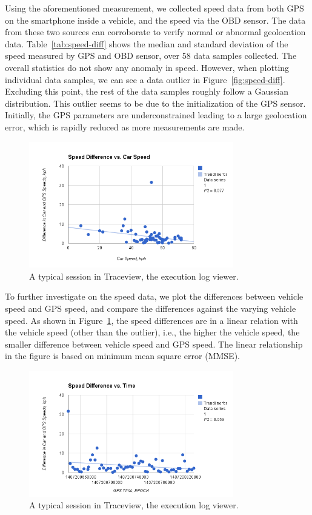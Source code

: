 Using the aforementioned measurement, we collected speed data from both GPS 
on the smartphone inside a vehicle, and the speed via the OBD sensor. 
The data from these two sources can corroborate to verify normal or abnormal 
geolocation data. Table~\ref{tab:speed-diff} shows the median and standard deviation
of the speed measured by GPS and OBD sensor, over 58 data samples collected. 
The overall statistics do not show any anomaly in speed. However, when plotting 
individual data samples, we can see a data outlier in Figure~\ref{fig:speed-diff}. 
Excluding this point, the rest of the data samples roughly follow a Gaussian 
distribution. This outlier seems to be due to the initialization of the
GPS sensor.  Initially, the GPS parameters are underconstrained leading to a large 
geolocation error, which is rapidly reduced as more measurements are made.


\begin{figure}
\centering
\includegraphics[width=3.5in]{car.png}
\caption{A typical session in Traceview, the execution log viewer.}
\label{fig:car}
\end{figure}

To further investigate on the speed data, we plot the differences between 
vehicle speed and GPS speed, and compare the differences against 
the varying vehicle speed. As shown in Figure~\ref{fig:car}, the speed 
differences are in a linear relation with the vehicle speed 
(other than the outlier), i.e., the 
higher the vehicle speed, the smaller difference between vehicle 
speed and GPS speed. 
The linear relationship in the figure is based on minimum mean 
square error (MMSE).

\begin{figure}
\centering
\includegraphics[width=3.5in]{time.png}
\caption{A typical session in Traceview, the execution log viewer.}
\label{fig:time}
\end{figure}

